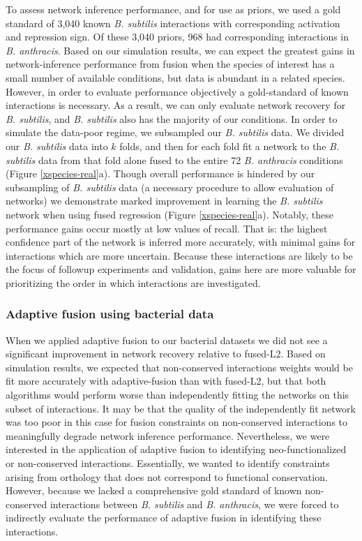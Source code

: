 \documentclass[11pt]{article}
\begin{document}
To assess network inference performance, and for use as priors, we used a gold standard of 3,040 known \textit{B. subtilis} interactions with corresponding activation and repression sign. 
Of these 3,040 priors, 968 had corresponding interactions in \textit{B. anthracis}. 
Based on our simulation results, we can expect the greatest gains in network-inference performance from fusion when the species of interest has a small number of available conditions, but data is abundant in a related species. 
However, in order to evaluate performance objectively a gold-standard of known interactions is necessary. 
As a result, we can only evaluate network recovery for \textit{B. subtilis}, and \textit{B. subtilis} also has the majority of our conditions. 
In order to simulate the data-poor regime, we subsampled our \textit{B. subtilis} data. 
We divided our \textit{B. subtilis} data into $k$ folds, and then for each fold fit a network to the \textit{B. subtilis} data from that fold alone fused to the entire 72 \textit{B. anthracis} conditions (Figure \ref{xspecies-real}a). 
Though overall performance is hindered by our subsampling of \textit{B. subtilis} data (a necessary procedure to allow evaluation of networks) we demonstrate marked improvement in learning the \textit{B. subtilis} network when using fused regression (Figure \ref{xspecies-real}a). 
Notably, these performance gains occur mostly at low values of recall. That is: the highest confidence part of the network is inferred more accurately, with minimal gains for interactions which are more uncertain. Because these interactions are likely to be the focus of followup experiments and validation, gains here are more valuable for prioritizing the order in which interactions are investigated. 

\subsubsection{Adaptive fusion using bacterial data}
When we applied adaptive fusion to our bacterial datasets we did not see a significant improvement in network recovery relative to fused-L2. Based on simulation results, we expected that non-conserved interactions weights would be fit more accurately with adaptive-fusion than with fused-L2, but that both algorithms would perform worse than independently fitting the networks on this subset of interactions. It may be that the quality of the independently fit network was too poor in this case for fusion constraints on non-conserved interactions to meaningfully degrade network inference performance. Nevertheless, we were interested in the application of adaptive fusion to identifying neo-functionalized or non-conserved interactions. Essentially, we wanted to identify constraints arising from orthology that does not correspond to functional conservation. However, because we lacked a comprehensive gold standard of known non-conserved interactions between \textit{B. subtilis} and \textit{B. anthracis}, we were forced to indirectly evaluate the performance of adaptive fusion in identifying these interactions.
\end{document}
